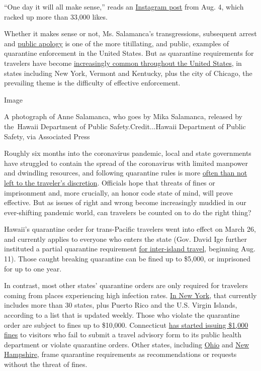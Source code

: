 ``One day it will all make sense,'' reads an
\href{https://www.instagram.com/p/CDbn_vinVjS/}{Instagram post} from
Aug. 4, which racked up more than 33,000 likes.

Whether it makes sense or not, Ms. Salamanca's transgressions,
subsequent arrest and
\href{https://www.youtube.com/watch?v=1DA9436drzo}{public apology} is
one of the more titillating, and public, examples of quarantine
enforcement in the United States. But as quarantine requirements for
travelers have become
\href{https://www.nytimes3xbfgragh.onion/2020/07/10/travel/state-travel-restrictions.html}{increasingly
common throughout the United States}, in states including New York,
Vermont and Kentucky, plus the city of Chicago, the prevailing theme is
the difficulty of effective enforcement.

Image

A photograph of Anne Salamanca, who goes by Mika Salamanca, released by
the~Hawaii Department of Public Safety.Credit...Hawaii Department of
Public Safety, via Associated Press

Roughly six months into the coronavirus pandemic, local and state
governments have struggled to contain the spread of the coronavirus with
limited manpower and dwindling resources, and following quarantine rules
is more
\href{https://www.nytimes3xbfgragh.onion/2020/08/16/nyregion/coronavirus-quarantine-nyc.html}{often
than not left to the traveler's discretion}. Officials hope that threats
of fines or imprisonment and, more crucially, an honor code state of
mind, will prove effective. But as issues of right and wrong become
increasingly muddied in our ever-shifting pandemic world, can travelers
be counted on to do the right thing?

Hawaii's quarantine order for trans-Pacific travelers went into effect
on March 26, and currently applies to everyone who enters the state
(Gov. David Ige further instituted a partial quarantine requirement
\href{https://www.khon2.com/coronavirus/reminder-partial-interisland-travel-quarantine-goes-into-effect-aug-11/}{for
inter-island travel}, beginning Aug. 11). Those caught breaking
quarantine can be fined up to \$5,000, or imprisoned for up to one year.

In contrast, most other states' quarantine orders are only required for
travelers coming from places experiencing high infection rates.
\href{https://coronavirus.health.ny.gov/covid-19-travel-advisory}{In New
York}, that currently includes more than 30 states, plus Puerto Rico and
the U.S. Virgin Islands, according to a list that is updated weekly.
Those who violate the quarantine order are subject to fines up to
\$10,000. Connecticut
\href{https://ctmirror.org/2020/08/12/lamont-administration-fines-5-more-ct-residents-for-violating-covid-travel-rules/}{has
started issuing \$1,000 fines} to visitors who fail to submit a travel
advisory form to its public health department or violate quarantine
orders. Other states, including
\href{https://coronavirus.ohio.gov/wps/portal/gov/covid-19/families-and-individuals/COVID-19-Travel-Advisory/COVID-19-Travel-Advisory}{Ohio}
and \href{https://www.covidguidance.nh.gov/out-state-visitors}{New
Hampshire}, frame quarantine requirements as recommendations or requests
without the threat of fines.


